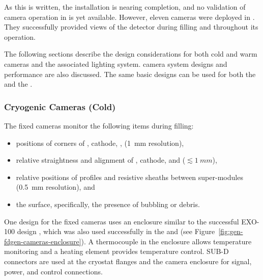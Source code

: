 As this is written, the  installation is nearing completion, and no validation of camera operation in  is yet available.   
However,
eleven cameras were deployed in .
They successfully provided views of the detector during filling and throughout
its operation. %

The following sections describe the design considerations for both cold
and warm cameras and the associated lighting system.  camera system designs and performance are also discussed.  
The same basic
designs can be used for both the  and the . %



\subsubsection{Cryogenic Cameras (Cold)}

The fixed cameras
monitor the following items during filling:
\begin{itemize}
\item positions of corners of , cathode, ,  (\SI{1}{mm} resolution),
\item relative straightness and alignment of , cathode, and  (\(\lesssim\SI{1}{mm}\)),
\item relative positions of  profiles and resistive sheaths between super-modules (\SI{0.5}{mm} resolution), and 
\item the \lar surface, specifically, the presence of bubbling or debris.
\end{itemize}




One design for the  fixed cameras uses an enclosure similar to
the successful EXO-100 design \cite{Delaquis:2013hva}, which was also
used successfully in the   
and  (see Figure~\ref{fig:gen-fdgen-cameras-enclosure}).
A thermocouple in the enclosure allows temperature monitoring and a heating element provides temperature control.  
SUB-D 
connectors are used at the cryostat flanges and the camera enclosure for signal, power, and control connections.


